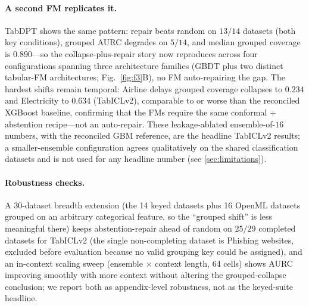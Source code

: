 \documentclass[pdflatex,sn-mathphys-num]{sn-jnl}
\begin{document}
\paragraph{A second FM replicates it.} TabDPT shows the same pattern: repair beats random on $13/14$ datasets
(both key conditions), grouped AURC degrades on $5/14$, and median grouped coverage is $0.890$---so the
collapse-plus-repair story now reproduces across four configurations spanning three architecture families
(GBDT plus two distinct tabular-FM architectures; Fig.~\ref{fig:f3}B),
no FM auto-repairing the gap. The hardest shifts remain temporal: Airline delays grouped
coverage collapses to $0.234$ and Electricity to $0.634$ (TabICLv2), comparable to or worse than the
reconciled XGBoost baseline, confirming that the FMs require the same conformal + abstention recipe---not an
auto-repair. These leakage-ablated ensemble-of-$16$ numbers, with the reconciled GBM reference, are the headline TabICLv2 results; a smaller-ensemble configuration agrees qualitatively on the shared classification datasets and is not used for any headline number (see
\cref{sec:limitations}). \paragraph{Robustness checks.} A $30$-dataset breadth extension (the 14 keyed datasets
plus 16 OpenML datasets grouped on an arbitrary categorical feature, so the ``grouped shift'' is less
meaningful there) keeps abstention-repair ahead of random on $25/29$ completed datasets for TabICLv2 (the
single non-completing dataset is Phishing websites, excluded before evaluation because no valid grouping key could be assigned), and an
in-context scaling sweep (ensemble $\times$ context length, 64 cells) shows AURC improving smoothly with more
context without altering the grouped-collapse conclusion; we report both as appendix-level robustness, not as
the keyed-suite headline.
\end{document}
